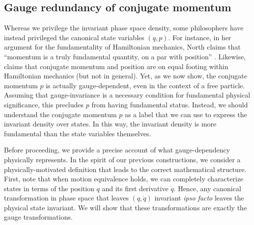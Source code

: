 \documentclass[12pt, english, twoside]{article} %
\begin{document}

\subsection{Gauge redundancy of conjugate momentum}
\label{gauge_momentum}

Whereas we privilege the invariant phase space density, some philosophers have instead privileged the canonical state variables $(q, p)$. For instance, in her argument for the fundamentality of Hamiltonian mechanics, North claims that ``momentum is a truly fundamental quantity, on a par with position'' \parencites*[77]{North}. Likewise, \textcites[164,171]{Wallace} claims that conjugate momentum and position are on equal footing within Hamiltonian mechanics (but not in general). Yet, as we now show, the conjugate momentum $p$ is actually gauge-dependent, even in the context of a free particle. Assuming that gauge-invariance is a necessary condition for fundamental physical significance, this precludes $p$ from having fundamental status. Instead, we should understand the conjugate momentum $p$ as a label that we can use to express the invariant density over states. In this way, the invariant density is more fundamental than the state variables themselves. 

Before proceeding, we provide a precise account of what gauge-dependency physically represents. In the spirit of our previous constructions, we consider a physically-motivated definition that leads to the correct mathematical structure. First, note that when motion equivalence holds, we can completely characterize states in terms of the position $q$ and its first derivative $\dot{q}$. Hence, any canonical transformation in phase space that leaves $(q,\dot{q}) $ invariant \textit{ipso facto} leaves the physical state invariant. We will show that these transformations are exactly the gauge transformations.
\end{document}
